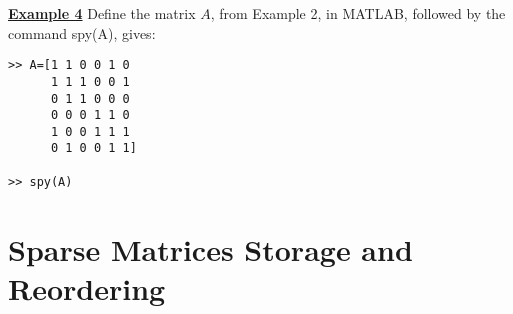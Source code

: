 \newpage
\noindent
{\bf\underline {Example 4}}
\vskip 3pt
Define the matrix $A$, from Example 2, in MATLAB, followed by the command
spy(A), gives:

  \begin{minipage}[  ]{0.50\linewidth}
    \begin{lstlisting}
>> A=[1 1 0 0 1 0
      1 1 1 0 0 1
      0 1 1 0 0 0
      0 0 0 1 1 0
      1 0 0 1 1 1
      0 1 0 0 1 1]

>> spy(A)
    \end{lstlisting}
  \end{minipage}
  \begin{minipage}[]{0.49\linewidth}
    \centering
	
  \end{minipage}


\section{Sparse Matrices Storage and Reordering}
